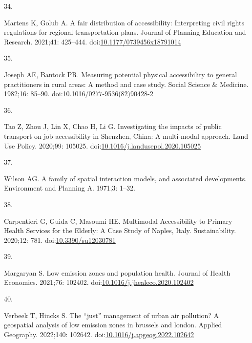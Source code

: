 \documentclass[10pt,letterpaper]{article}
\newlength{\cslhangindent}
\newlength{\csllabelwidth}
\newlength{\cslentryspacingunit} %
\newenvironment{CSLReferences}[2] %
 {%
  \setlength{\parindent}{0pt}
  \ifodd #1
  \let\oldpar\par
  \def\par{\hangindent=\cslhangindent\oldpar}
  \fi
  \setlength{\parskip}{#2\cslentryspacingunit}
 }%
 {}
\newcommand{\CSLLeftMargin}[1]{\parbox[t]{\csllabelwidth}{#1}}
\newcommand{\CSLRightInline}[1]{\parbox[t]{\linewidth - \csllabelwidth}{#1}\break}
\begin{document}
\begin{CSLReferences}{0}{0}
\leavevmode{}%
\CSLLeftMargin{34. }%
\CSLRightInline{Martens K, Golub A. A fair distribution of
accessibility: Interpreting civil rights regulations for regional
transportation plans. Journal of Planning Education and Research.
2021;41: 425--444.
doi:\href{https://doi.org/10.1177/0739456x18791014}{10.1177/0739456x18791014}}

\leavevmode{}%
\CSLLeftMargin{35. }%
\CSLRightInline{Joseph AE, Bantock PR. Measuring potential physical
accessibility to general practitioners in rural areas: A method and case
study. Social Science \& Medicine. 1982;16: 85--90.
doi:\href{https://doi.org/10.1016/0277-9536(82)90428-2}{10.1016/0277-9536(82)90428-2}}

\leavevmode{}%
\CSLLeftMargin{36. }%
\CSLRightInline{Tao Z, Zhou J, Lin X, Chao H, Li G. Investigating the
impacts of public transport on job accessibility in {Shenzhen}, {China}:
A multi-modal approach. Land Use Policy. 2020;99: 105025.
doi:\href{https://doi.org/10.1016/j.landusepol.2020.105025}{10.1016/j.landusepol.2020.105025}}

\leavevmode{}%
\CSLLeftMargin{37. }%
\CSLRightInline{Wilson AG. A family of spatial interaction models, and
associated developments. Environment and Planning A. 1971;3: 1--32. }

\leavevmode{}%
\CSLLeftMargin{38. }%
\CSLRightInline{Carpentieri G, Guida C, Masoumi HE. Multimodal
{Accessibility} to {Primary Health Services} for the {Elderly}: {A Case
Study} of {Naples}, {Italy}. Sustainability. 2020;12: 781.
doi:\href{https://doi.org/10.3390/su12030781}{10.3390/su12030781}}

\leavevmode{}%
\CSLLeftMargin{39. }%
\CSLRightInline{Margaryan S. Low emission zones and population health.
Journal of Health Economics. 2021;76: 102402.
doi:\href{https://doi.org/10.1016/j.jhealeco.2020.102402}{10.1016/j.jhealeco.2020.102402}}

\leavevmode{}%
\CSLLeftMargin{40. }%
\CSLRightInline{Verbeek T, Hincks S. The {``just''} management of urban
air pollution? A geospatial analysis of low emission zones in brussels
and london. Applied Geography. 2022;140: 102642.
doi:\href{https://doi.org/10.1016/j.apgeog.2022.102642}{10.1016/j.apgeog.2022.102642}}


\end{CSLReferences}
\end{document}
